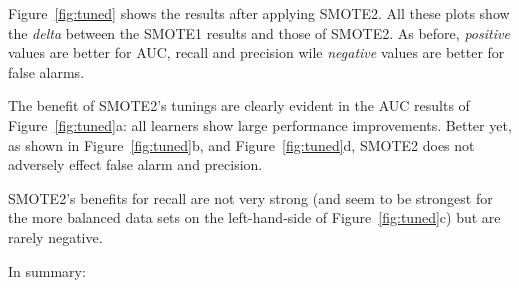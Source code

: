 Figure~\ref{fig:tuned} shows the results
after applying SMOTE2. All these
plots show the {\em delta} between
the SMOTE1 results and those of SMOTE2.
As before, {\em positive}  values
are better for AUC, recall and precision
wile {\em negative} values are better for false alarms.

The benefit of SMOTE2's tunings are clearly evident in the AUC results of  Figure~\ref{fig:tuned}a:
all learners show large performance improvements. 
Better yet,  as
shown in
Figure~\ref{fig:tuned}b, and Figure~\ref{fig:tuned}d, SMOTE2 does
not adversely effect false alarm and precision.

SMOTE2's benefits for recall are not very
strong (and seem to be strongest for the more balanced data sets on the left-hand-side of Figure~\ref{fig:tuned}c)
but are rarely negative.






In summary:

